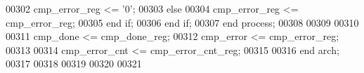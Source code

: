 \begin{DoxyCode}
00302          \textcolor{vhdlchar}{cmp_error_reg} \textcolor{vhdlchar}{<=} \textcolor{vhdlchar}{'}\textcolor{vhdllogic}{}\textcolor{vhdllogic}{0}\textcolor{vhdlchar}{'};
00303       \textcolor{keywordflow}{else} 
00304          \textcolor{vhdlchar}{cmp_error_reg} \textcolor{vhdlchar}{<=} \textcolor{vhdlchar}{cmp_error_reg};
00305       \textcolor{keywordflow}{end} \textcolor{keywordflow}{if};
00306    \textcolor{keywordflow}{end} \textcolor{keywordflow}{if};
00307 \textcolor{keywordflow}{end} \textcolor{keywordflow}{process};
00308 
00309 
00310 
00311 \textcolor{vhdlchar}{cmp_done}       \textcolor{vhdlchar}{<=} \textcolor{vhdlchar}{cmp_done_reg};
00312 \textcolor{vhdlchar}{cmp_error}      \textcolor{vhdlchar}{<=} \textcolor{vhdlchar}{cmp_error_reg};
00313 
00314 \textcolor{vhdlchar}{cmp_error_cnt} \textcolor{vhdlchar}{<=} \textcolor{vhdlchar}{cmp_error_cnt_reg};
00315 
00316 \textcolor{keywordflow}{end} \textcolor{vhdlchar}{arch};   
00317 
00318 
00319 
00320 
00321 
\end{DoxyCode}
